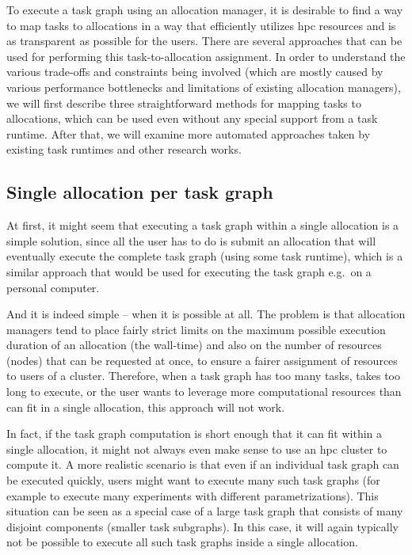 To execute a task graph using an allocation manager, it is desirable to find a way to map tasks to
allocations in a way that efficiently utilizes \gls{hpc} resources and is as
transparent as possible for the users. There are several approaches that can be used for performing
this task-to-allocation assignment. In order to understand the various trade-offs and constraints
being involved (which are mostly caused by various performance bottlenecks and limitations of
existing allocation managers), we will first describe three straightforward methods for mapping
tasks to allocations, which can be used even without any special support from a task runtime. After
that, we will examine more automated approaches taken by existing task runtimes and other research
works.

\subsection*{Single allocation per task graph}
At first, it might seem that executing a task graph within a single allocation is a simple
solution, since all the user has to do is submit an allocation that will eventually execute the
complete task graph (using some task runtime), which is a similar approach that would be used for
executing the task graph e.g.\ on a personal computer.

And it is indeed simple -- when it is possible at all. The problem is that allocation managers tend
to place fairly strict limits on the maximum possible execution duration of an allocation (the
wall-time) and also on the number of resources (nodes) that can be requested at once, to ensure a
fairer assignment of resources to users of a cluster. Therefore, when a task graph has too many
tasks, takes too long to execute, or the user wants to leverage more computational resources than
can fit in a single allocation, this approach will not work.

In fact, if the task graph computation is short enough that it can fit within a single allocation,
it might not always even make sense to use an \gls{hpc} cluster to compute it. A more
realistic scenario is that even if an individual task graph can be executed quickly, users might
want to execute many such task graphs (for example to execute many experiments with different
parametrizations). This situation can be seen as a special case of a large task graph that consists
of many disjoint components (smaller task subgraphs). In this case, it will again typically not be
possible to execute all such task graphs inside a single allocation.

